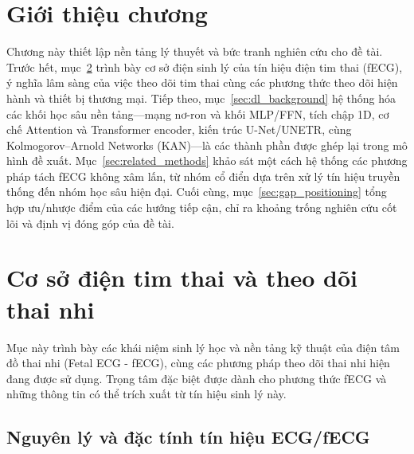 \documentclass[../DoAn.tex]{subfiles}
\begin{document}

\section{Giới thiệu chương}

Chương này thiết lập nền tảng lý thuyết và bức tranh nghiên cứu cho đề tài. Trước hết, mục~\ref{sec:fecg_background} trình bày cơ sở điện sinh lý của tín hiệu điện tim thai (fECG), ý nghĩa lâm sàng của việc theo dõi tim thai cùng các phương thức theo dõi hiện hành và thiết bị thương mại. Tiếp theo, mục~\ref{sec:dl_background} hệ thống hóa các khối học sâu nền tảng---mạng nơ-ron và khối MLP/FFN, tích chập 1D, cơ chế Attention và Transformer encoder, kiến trúc U-Net/UNETR, cùng Kolmogorov--Arnold Networks (KAN)---là các thành phần được ghép lại trong mô hình đề xuất. Mục~\ref{sec:related_methods} khảo sát một cách hệ thống các phương pháp tách fECG không xâm lấn, từ nhóm cổ điển dựa trên xử lý tín hiệu truyền thống đến nhóm học sâu hiện đại. Cuối cùng, mục~\ref{sec:gap_positioning} tổng hợp ưu/nhược điểm của các hướng tiếp cận, chỉ ra khoảng trống nghiên cứu cốt lõi và định vị đóng góp của đề tài.

\section{Cơ sở điện tim thai và theo dõi thai nhi}
\label{sec:fecg_background}

Mục này trình bày các khái niệm sinh lý học và nền tảng kỹ thuật của điện tâm đồ thai nhi (Fetal ECG - fECG), cùng các phương pháp theo dõi thai nhi hiện đang được sử dụng. Trọng tâm đặc biệt được dành cho phương thức fECG và những thông tin có thể trích xuất từ tín hiệu sinh lý này.

\subsection{Nguyên lý và đặc tính tín hiệu ECG/fECG}
\end{document}
